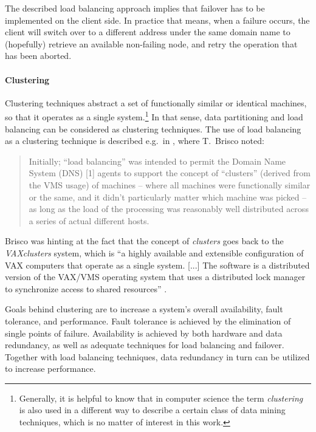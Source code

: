 The described load balancing approach implies that failover has to be implemented on the client side. In practice that means, when a failure occurs, the client will switch over to a different address under the same domain name to (hopefully) retrieve an available non-failing node, and retry the operation that has been aborted.

\paragraph{Clustering}
Clustering techniques abstract a set of functionally similar or identical machines, so that it operates as a single system.\footnote{Generally, it is helpful to know that in computer science the term \emph{clustering} is also used in a different way to describe a certain class of data mining techniques, which is no matter of interest in this work.} In that sense, data partitioning and load balancing can be considered as clustering techniques. The use of load balancing as a clustering technique is described e.g.\ in \cite{rfc1794}, where T.\ Brisco noted:
\begin{quote}
	Initially; ``load balancing'' was intended to permit the Domain Name
	System (DNS) [1] agents to support the concept of ``clusters'' (derived
	from the VMS usage) of machines -- where all machines were
	functionally similar or the same, and it didn't particularly matter
	which machine was picked -- as long as the load of the processing was
	reasonably well distributed across a series of actual different
	hosts.
\end{quote}

Brisco was hinting at the fact that the concept of \emph{clusters} goes back to the \emph{VAXclusters} system, which is ``a highly available and extensible configuration of VAX computers that operate as a single system. [...] The software is a distributed version of the VAX/VMS operating system that uses a distributed lock manager to synchronize access to shared resources'' \cite{KLS86}.

Goals behind clustering are to increase a system's overall availability, fault tolerance, and performance. Fault tolerance is achieved by the elimination of single points of failure. Availability is achieved by both hardware and data redundancy, as well as adequate techniques for load balancing and failover. Together with load balancing techniques, data redundancy in turn can be utilized to increase performance.
